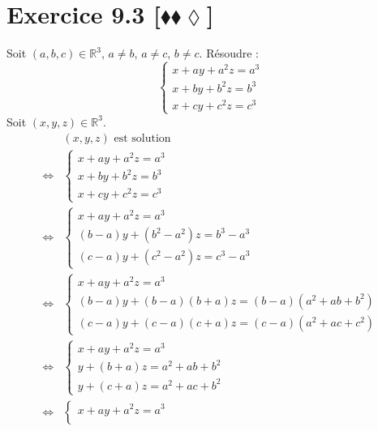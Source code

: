 \documentclass[10pt]{article}
\begin{document}
\section*{Exercice 9.3 [$\blacklozenge\blacklozenge\lozenge$]}
\begin{tcolorbox}[enhanced, width=7in, center, size=fbox, fontupper=\large, drop shadow southwest]
    Soit $(a,b,c)\in\mathbb{R}^3$, $a \neq b$, $a \neq c$, $b \neq c$. Résoudre :
    \begin{equation*}
        \begin{cases}
            x+ay+a^2z=a^3\\
            x+by+b^2z=b^3\\
            x+cy+c^2z=c^3
        \end{cases}
    \end{equation*}
    Soit $(x,y,z)\in\mathbb{R}^3$.
    \begin{align*}
        &(x,y,z) \text{ est solution}\\ \iff&
        \begin{cases}
            x+ay+a^2z=a^3\\
            x+by+b^2z=b^3\\
            x+cy+c^2z=c^3
        \end{cases}
        \\\iff &
        \begin{cases}
            x+ay+a^2z=a^3\\
            (b-a)y+(b^2-a^2)z=b^3-a^3\\
            (c-a)y+(c^2-a^2)z=c^3-a^3
        \end{cases}
        \\\iff &
        \begin{cases}
            x+ay+a^2z=a^3\\
            (b-a)y+(b-a)(b+a)z=(b-a)(a^2+ab+b^2)\\
            (c-a)y+(c-a)(c+a)z=(c-a)(a^2+ac+c^2)
        \end{cases}
        \\\iff &
        \begin{cases}
            x+ay+a^2z=a^3\\
            y+(b+a)z=a^2+ab+b^2\\
            y+(c+a)z=a^2+ac+b^2
        \end{cases}
        \\\iff &
        \begin{cases}
            x+ay+a^2z=a^3\\

\end{cases}
\end{align*}
\end{tcolorbox}
\end{document}
